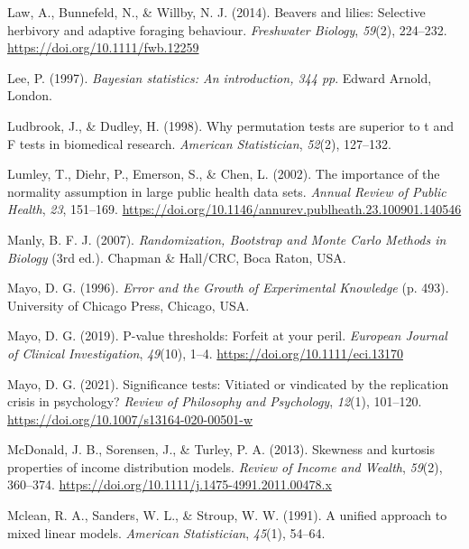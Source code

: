 \documentclass[
  openany]{krantz}
\newlength{\cslhangindent}
\newlength{\cslentryspacingunit} %
\newenvironment{CSLReferences}[2] %
 {%
  \setlength{\parindent}{0pt}
  \ifodd #1
  \let\oldpar\par
  \def\par{\hangindent=\cslhangindent\oldpar}
  \fi
  \setlength{\parskip}{#2\cslentryspacingunit}
 }%
 {}
\begin{document}
\begin{CSLReferences}{1}{0}
\leavevmode{}%
Law, A., Bunnefeld, N., \& Willby, N. J. (2014). {Beavers and lilies: Selective herbivory and adaptive foraging behaviour}. \emph{Freshwater Biology}, \emph{59}(2), 224--232. \url{https://doi.org/10.1111/fwb.12259}

\leavevmode{}%
Lee, P. (1997). \emph{Bayesian statistics: An introduction, 344 pp}. Edward Arnold, London.

\leavevmode{}%
Ludbrook, J., \& Dudley, H. (1998). Why permutation tests are superior to t and {F} tests in biomedical research. \emph{American Statistician}, \emph{52}(2), 127--132.

\leavevmode{}%
Lumley, T., Diehr, P., Emerson, S., \& Chen, L. (2002). {The importance of the normality assumption in large public health data sets}. \emph{Annual Review of Public Health}, \emph{23}, 151--169. \url{https://doi.org/10.1146/annurev.publheath.23.100901.140546}

\leavevmode{}%
Manly, B. F. J. (2007). \emph{{Randomization, Bootstrap and Monte Carlo Methods in Biology}} (3rd ed.). Chapman \& Hall/CRC, Boca Raton, USA.

\leavevmode{}%
Mayo, D. G. (1996). \emph{{Error and the Growth of Experimental Knowledge}} (p. 493). University of Chicago Press, Chicago, USA.

\leavevmode{}%
Mayo, D. G. (2019). {P-value thresholds: Forfeit at your peril}. \emph{European Journal of Clinical Investigation}, \emph{49}(10), 1--4. \url{https://doi.org/10.1111/eci.13170}

\leavevmode{}%
Mayo, D. G. (2021). Significance tests: Vitiated or vindicated by the replication crisis in psychology? \emph{Review of Philosophy and Psychology}, \emph{12}(1), 101--120. \url{https://doi.org/10.1007/s13164-020-00501-w}

\leavevmode{}%
McDonald, J. B., Sorensen, J., \& Turley, P. A. (2013). {Skewness and kurtosis properties of income distribution models}. \emph{Review of Income and Wealth}, \emph{59}(2), 360--374. \url{https://doi.org/10.1111/j.1475-4991.2011.00478.x}

\leavevmode{}%
Mclean, R. A., Sanders, W. L., \& Stroup, W. W. (1991). {A unified approach to mixed linear models}. \emph{American Statistician}, \emph{45}(1), 54--64.


\end{CSLReferences}
\end{document}

